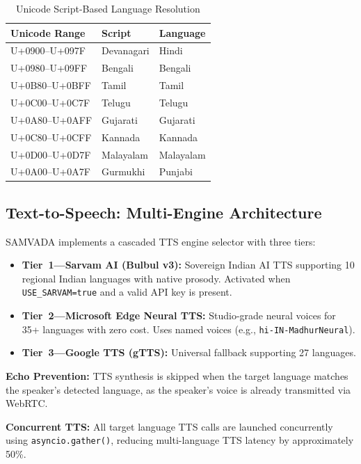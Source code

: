 \documentclass[conference]{IEEEtran}
\begin{document}
\begin{table}[htbp]
\centering
\caption{Unicode Script-Based Language Resolution}
\label{tab:unicode}
\begin{tabular}{lll}
\toprule
\textbf{Unicode Range} & \textbf{Script} & \textbf{Language} \\
\midrule
U+0900--U+097F & Devanagari & Hindi \\
U+0980--U+09FF & Bengali & Bengali \\
U+0B80--U+0BFF & Tamil & Tamil \\
U+0C00--U+0C7F & Telugu & Telugu \\
U+0A80--U+0AFF & Gujarati & Gujarati \\
U+0C80--U+0CFF & Kannada & Kannada \\
U+0D00--U+0D7F & Malayalam & Malayalam \\
U+0A00--U+0A7F & Gurmukhi & Punjabi \\
\bottomrule
\end{tabular}
\end{table}

\subsection{Text-to-Speech: Multi-Engine Architecture}

SAMVADA implements a cascaded TTS engine selector with three tiers:

\begin{itemize}
  \item \textbf{Tier~1---Sarvam AI (Bulbul v3):} Sovereign Indian AI TTS supporting 10 regional Indian languages with native prosody. Activated when \texttt{USE\_SARVAM=true} and a valid API key is present.
  \item \textbf{Tier~2---Microsoft Edge Neural TTS:} Studio-grade neural voices for 35+ languages with zero cost. Uses named voices (e.g., \texttt{hi-IN-MadhurNeural}).
  \item \textbf{Tier~3---Google TTS (gTTS):} Universal fallback supporting 27 languages.
\end{itemize}

\textbf{Echo Prevention:} TTS synthesis is skipped when the target language matches the speaker's detected language, as the speaker's voice is already transmitted via WebRTC.

\textbf{Concurrent TTS:} All target language TTS calls are launched concurrently using \texttt{asyncio.gather()}, reducing multi-language TTS latency by approximately 50\%.
\end{document}

